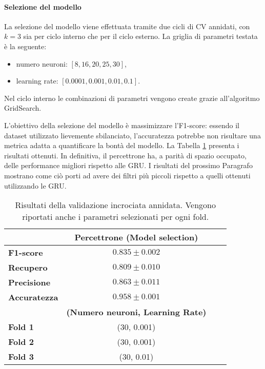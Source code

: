 \documentclass[../../main.tex]{subfiles}
\begin{document}
    \paragraph{Selezione del modello}

    La selezione del modello viene effettuata tramite due cicli di CV annidati, con $k = 3$ sia per ciclo interno che per il ciclo esterno. La griglia di parametri testata è la seguente:
    \begin{itemize}
        \item numero neuroni: $[8, 16, 20, 25, 30]$,
        \item learning rate: $[0.0001, 0.001, 0.01, 0.1]$.
    \end{itemize}

    Nel ciclo interno le combinazioni di parametri vengono create grazie all'algoritmo GridSearch.

    L'obiettivo della selezione del modello è massimizzare l'F1-score: essendo il dataset utilizzato lievemente sbilanciato, l'accuratezza potrebbe non risultare una metrica adatta a quantificare la bontà del modello. La Tabella \ref{tab:modelSelection} presenta i risultati ottenuti. In definitiva, il percettrone ha, a parità di spazio occupato, delle performance migliori rispetto alle GRU. I risultati del prossimo Paragrafo mostrano come ciò porti ad avere dei filtri più piccoli rispetto a quelli ottenuti utilizzando le GRU.
    \begin{table}[H]
        \centering                  
        \begin{tabular}{lccc}
            \toprule
            {}  &   \textbf{Percettrone (Model selection)}\\
            \midrule
            \textbf{F1-score }      &    $0.835 \pm 0.002$ \\
            \textbf{Recupero   }    &    $0.809 \pm 0.010$ \\
            \textbf{Precisione }    &    $0.863 \pm 0.011$ \\
            \textbf{Accuratezza }   &    $0.958 \pm 0.001$ \\
            \midrule
            {} & \textbf{(Numero neuroni, Learning Rate)}\\
            \midrule
            \textbf{Fold 1} &   (30, 0.001)\\ 
            \textbf{Fold 2} &   (30, 0.001)\\
            \textbf{Fold 3} &   (30, 0.01)\\
            \bottomrule
        \end{tabular}
        \caption{Risultati della validazione incrociata annidata. Vengono riportati anche i parametri selezionati per ogni fold.}
        \label{tab:modelSelection}
    \end{table}
\end{document}
